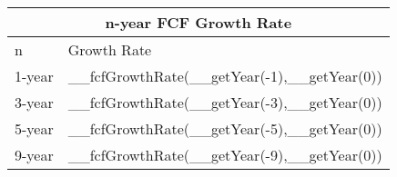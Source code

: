 \begin{tabularx}{\textwidth}{|X|X|}
 \hline
 \multicolumn{2}{|c|}{n-year FCF Growth Rate} \\
 \hline
 n & Growth Rate\\
 \hline
 1-year & __fcfGrowthRate(__getYear(-1),__getYear(0)) \\
 3-year & __fcfGrowthRate(__getYear(-3),__getYear(0)) \\
 5-year & __fcfGrowthRate(__getYear(-5),__getYear(0)) \\
 9-year & __fcfGrowthRate(__getYear(-9),__getYear(0)) \\
 \hline
\end{tabularx}